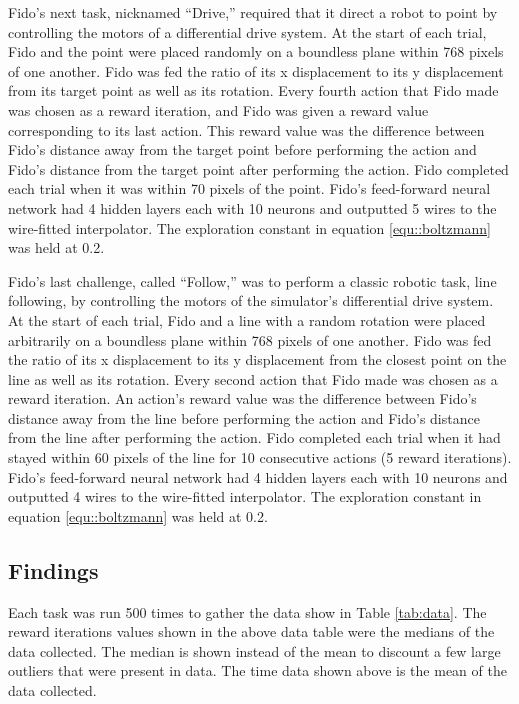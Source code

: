 Fido's next task, nicknamed ``Drive,'' required that it direct a robot to point by controlling the motors of a differential drive system. At the start of each trial, Fido and the point were placed randomly on a boundless plane within 768 pixels of one another. Fido was fed the ratio of its x displacement to its y displacement from its target point as well as its rotation. Every fourth action that Fido made was chosen as a reward iteration, and Fido was given a reward value corresponding to its last action. This reward value was the difference between Fido's distance away from the target point before performing the action and Fido's distance from the target point after performing the action. Fido completed each trial when it was within 70 pixels of the point. Fido's feed-forward neural network had 4 hidden layers each with 10 neurons and outputted 5 wires to the wire-fitted interpolator. The exploration constant in equation \ref{equ::boltzmann} was held at 0.2.

Fido's last challenge, called ``Follow,'' was to perform a classic robotic task, line following, by controlling the motors of the simulator's differential drive system. At the start of each trial, Fido and a line with a random rotation were placed arbitrarily on a boundless plane within 768 pixels of one another. Fido was fed the ratio of its x displacement to its y displacement from the closest point on the line as well as its rotation. Every second action that Fido made was chosen as a reward iteration. An action's reward value was the difference between Fido's distance away from the line before performing the action and Fido's distance from the line after performing the action. Fido completed each trial when it had stayed within 60 pixels of the line for 10 consecutive actions (5 reward iterations). Fido's feed-forward neural network had 4 hidden layers each with 10 neurons and outputted 4 wires to the wire-fitted interpolator. The exploration constant in equation \ref{equ::boltzmann} was held at 0.2.

\subsection{Findings}

Each task was run 500 times to gather the data show in Table \ref{tab:data}.  The reward iterations values shown in the above data table were the medians of the data collected. The median is shown instead of the mean to discount a few large outliers that were present in data. The time data shown above is the mean of the data collected.

